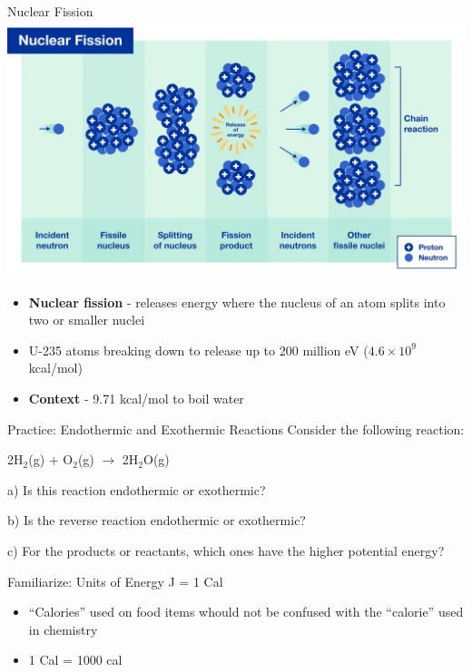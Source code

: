 \documentclass[11pt]{beamer}
\begin{document}
\begin{frame}{Nuclear Fission}
  \centering
  \includegraphics[width=0.8\linewidth]{nuclear_fission}

  \begin{itemize}
  \item \textbf{Nuclear fission} - releases energy where the
    nucleus of an atom splits into two or smaller nuclei
  \item U-235 atoms breaking down to release up to 200 million
    eV ($4.6\times 10^9$ kcal/mol)
  \item \textbf{Context} - 9.71 kcal/mol to boil water
  \end{itemize}
\end{frame}

\begin{frame}{Practice: Endothermic and Exothermic Reactions}
  Consider the following reaction:

  2H$_2$(g) + O$_2$(g) $\rightarrow$ 2H$_2$O(g)

  a) Is this reaction endothermic or exothermic?

  b) Is the reverse reaction endothermic or exothermic?

  c) For the products or reactants, which ones have the higher
  potential energy?

\end{frame}

\begin{frame}{Familiarize: Units of Energy}
   J = 1 Cal

  \begin{itemize}
  \item ``Calories'' used on food items whould not be confused
    with the ``calorie'' used in chemistry
  \item 1 Cal = 1000 cal
  \end{itemize}
\end{frame}
\end{document}
